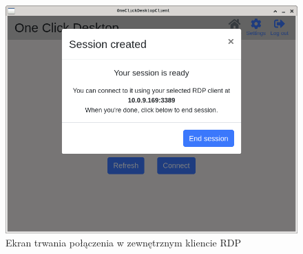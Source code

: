 \documentclass[../opis-rozwiazania.tex]{subfiles}
\begin{document}
\begin{figure}[ht!]
  \centering
  \includegraphics[width=\textwidth]{resources/client_session_nordp.png}
  \caption{Ekran trwania połączenia w zewnętrznym kliencie RDP}
  \label{figure:system_interaction.client.session_nordp}
\end{figure}
\end{document}

